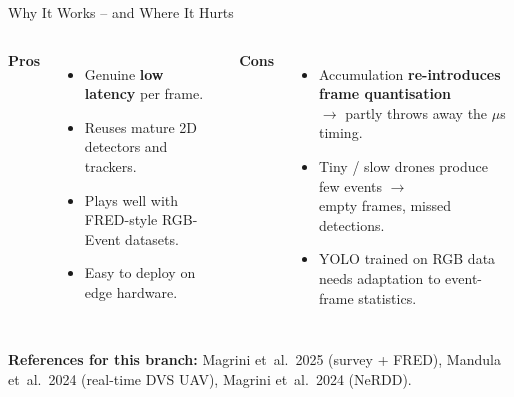 \documentclass[aspectratio=169,11pt]{beamer}
\begin{document}
\begin{frame}{Why It Works -- and Where It Hurts}
  \vspace{0.3em}
  \begin{columns}[T,onlytextwidth]
    \textbf{\color{accentgreen}Pros}
    \begin{itemize}
      \setlength\itemsep{0.3em}
      \item Genuine \textbf{low latency} per frame.
      \item Reuses mature 2D detectors and trackers.
      \item Plays well with FRED-style RGB-Event datasets.
      \item Easy to deploy on edge hardware.
    \end{itemize}

    \textbf{\color{accentred}Cons}
    \begin{itemize}
      \setlength\itemsep{0.3em}
      \item Accumulation \textbf{re-introduces frame quantisation}\\
            $\to$ partly throws away the $\mu$s timing.
      \item Tiny / slow drones produce few events $\to$\\
            empty frames, missed detections.
      \item YOLO trained on RGB data needs adaptation to event-frame statistics.
    \end{itemize}
  \end{columns}
  \vspace{0.4em}
  {\small \textbf{References for this branch:}
    Magrini et~al.\ 2025 (survey + FRED), Mandula et~al.\ 2024 (real-time DVS UAV),
    Magrini et~al.\ 2024 (NeRDD).}
\end{frame}
\end{document}
